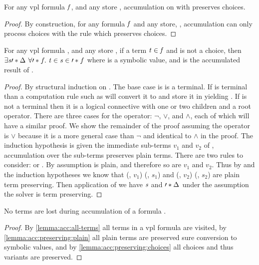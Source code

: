 \begin{lemma}
  \label{lemma:acc:preserving:choices}
  For any \ac{vpl} formula $\mathit{f}$, and any store \aStore{}, accumulation on
  \fV{} with \aStore{} preserves choices.
\end{lemma}
%
\begin{proof}
  By construction, for any formula $\mathit{f}$ and any store, \aStore{},
  accumulation can only process choices with the \acChc{} rule which preserves
  choices.
\end{proof}

\begin{lemma}
  \label{lemma:acc:preserving:plain}
  For any \ac{vpl} formula \fV, and any store \aStore{}, if a term $\mathit{t}{} \in
  \mathit{f}$ and \tV{} is not a choice, then $\exists\sV{}\prime*{\aStore{}}\ \forall\prime*{f}.\ \tV
  \in \sV{} \in \prime*{f}$ where \sV{} is a symbolic value, and  is
  the accumulated result of \fV{}.
\end{lemma}
%
\begin{proof}
  By structural induction on \tV{}. The base case is \tV{} is a terminal. If
  \tV{} is terminal than a computation rule such as \acRef{} will convert it to
  \sV{} and store it in \aStore{} yielding \prime*{\aStore{}}. If \tV{} is not a
  terminal then it is a logical connective with one or two children and a root
  operator. There are three cases for the operator: $\neg$, $\vee$, and
  $\wedge$, each of which will have a similar proof. We show the remainder of
  the proof assuming the operator is $\vee$ because it is a more general case
  than $\neg$ and identical to $\wedge$ in the proof. The induction hypothesis
  is given the immediate sub-terms $v_{1}$ and $v_{2}$ of \tV{}, accumulation
  over the sub-terms preserves plain terms. There are two rules to consider:
  \acOrS{} or \acOrV{}. By assumption \tV{} is plain, and therefore so are
  $v_{1}$ and $v_{2}$. Thus by \acOrS{} and the induction hypotheses we know
  that (\aStore{}, $v_1$) \accumulation (, $s_1$) and (,
  $v_2$) \accumulation (, $s_2$) are plain term preserving. Then
  application of \por{} we have $\mathit{s}$ and $\prime*{\Delta_{}}$ under the
  assumption the solver is term preserving.
\end{proof}
%
\begin{theorem}
  \label{thm:accumulation:term-preserving}
  No terms are lost during accumulation of a formula \fV{}.
\end{theorem}
%
\begin{proof}
  By \autoref{lemma:acc:all-terms} all terms in a \ac{vpl} formula are visited,
  by \autoref{lemma:acc:preserving:plain} all plain terms are preserved sure
  conversion to symbolic values, and by \autoref{lemma:acc:preserving:choices}
  all choices and thus variants are preserved.
\end{proof}

